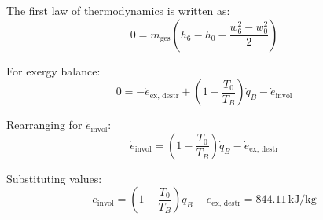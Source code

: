 The first law of thermodynamics is written as:  
\[
0 = m_{\text{ges}} (h_6 - h_0 - \frac{w_6^2 - w_0^2}{2})
\]

For exergy balance:  
\[
0 = -\dot{e}_{\text{ex, destr}} + \left(1 - \frac{T_0}{T_B}\right) \dot{q}_B - \dot{e}_{\text{invol}}
\]

Rearranging for \( \dot{e}_{\text{invol}} \):  
\[
\dot{e}_{\text{invol}} = \left(1 - \frac{T_0}{T_B}\right) \dot{q}_B - \dot{e}_{\text{ex, destr}}
\]

Substituting values:  
\[
\dot{e}_{\text{invol}} = \left(1 - \frac{T_0}{T_B}\right) q_B - e_{\text{ex, destr}} = 844.11 \, \text{kJ/kg}
\]